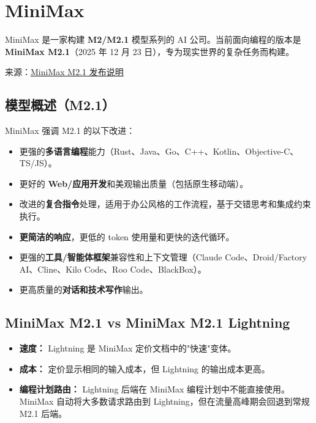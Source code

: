 \clearpage

\section{MiniMax}


MiniMax 是一家构建 \textbf{M2/M2.1} 模型系列的 AI 公司。当前面向编程的版本是 \textbf{MiniMax M2.1}（2025 年 12 月 23 日），专为现实世界的复杂任务而构建。

来源：\href{https://www.minimax.io/news/minimax-m21}{MiniMax M2.1 发布说明}

\subsection{模型概述（M2.1）}


MiniMax 强调 M2.1 的以下改进：

\begin{itemize}
  \item 更强的\textbf{多语言编程}能力（Rust、Java、Go、C++、Kotlin、Objective-C、TS/JS）。
  \item 更好的 \textbf{Web/应用开发}和美观输出质量（包括原生移动端）。
  \item 改进的\textbf{复合指令}处理，适用于办公风格的工作流程，基于交错思考和集成约束执行。
  \item \textbf{更简洁的响应}，更低的 token 使用量和更快的迭代循环。
  \item 更强的\textbf{工具/智能体框架}兼容性和上下文管理（Claude Code、Droid/Factory AI、Cline、Kilo Code、Roo Code、BlackBox）。
  \item 更高质量的\textbf{对话和技术写作}输出。
\end{itemize}


\subsection{MiniMax M2.1 vs MiniMax M2.1 Lightning}


\begin{itemize}
  \item \textbf{速度：} Lightning 是 MiniMax 定价文档中的"快速"变体。
  \item \textbf{成本：} 定价显示相同的输入成本，但 Lightning 的输出成本更高。
  \item \textbf{编程计划路由：} Lightning 后端在 MiniMax 编程计划中不能直接使用。MiniMax 自动将大多数请求路由到 Lightning，但在流量高峰期会回退到常规 M2.1 后端。
\end{itemize}


